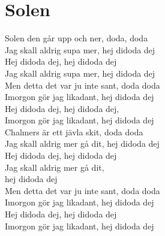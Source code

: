 \section{Solen}
Solen den går upp och ner, doda, doda\\
Jag skall aldrig supa mer, hej didoda dej\\
Hej didoda dej, hej didoda dej\\
Jag skall aldrig supa mer, hej didoda dej\\

Men detta det var ju inte sant, doda doda\\
Imorgon gör jag likadant, hej didoda dej\\
Hej didoda dej, hej didoda dej,\\
Imorgon gör jag likadant, hej didoda dej\\

Chalmers är ett jävla skit, doda doda\\
Jag skall aldrig mer gå dit, hej didoda dej\\
Hej didoda dej, hej didoda dej\\
Jag skall aldrig mer gå dit,\\
hej didoda dej\\

Men detta det var ju inte sant, doda doda\\
Imorgon gör jag likadant, hej didoda dej\\
Hej didoda dej, hej didoda dej\\
Imorgon gör jag likadant, hej didoda dej\\